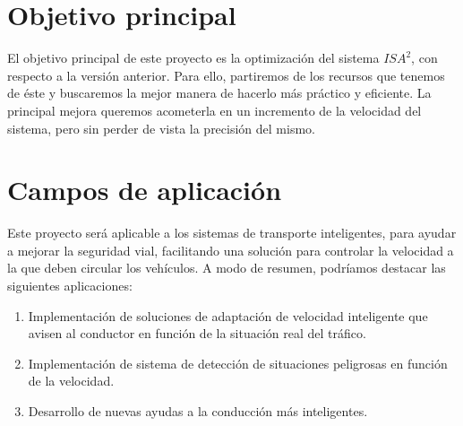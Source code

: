 



\section{Objetivo principal}


El objetivo principal de este proyecto es la optimización del sistema $ISA^{2}$, con respecto a la versión anterior. Para ello, partiremos de los recursos que tenemos de éste y buscaremos la mejor manera de hacerlo más práctico y eficiente. La principal mejora queremos acometerla en un incremento de la velocidad del sistema, pero sin perder de vista la precisión del mismo.

\section{Campos de aplicación}

Este proyecto será aplicable a los sistemas de transporte inteligentes, para ayudar a mejorar la seguridad vial, facilitando una solución para controlar la velocidad a la que deben circular los vehículos. A modo de resumen, podríamos destacar las siguientes aplicaciones:
\begin{enumerate}	
	\item Implementación de soluciones de adaptación de velocidad inteligente que avisen al conductor en función de la situación real del tráfico.
	\item Implementación de sistema de detección de situaciones peligrosas en función de la velocidad.
	\item Desarrollo de nuevas ayudas a la conducción más inteligentes.
\end{enumerate}

